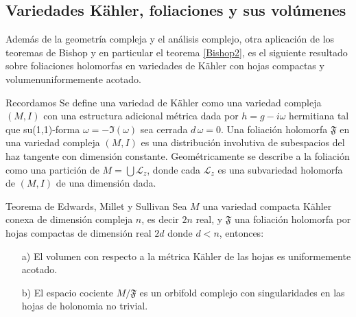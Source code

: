 \documentclass[letterpaper]{beamer}
\begin{document}
\subsection{Variedades K\"ahler, foliaciones y sus vol\'umenes}
\begin{frame} Adem\'as de la geometr\'ia compleja y el an\'alisis complejo, otra aplicaci\'on de los teoremas de Bishop y en particular el teorema
\ref{Bishop2}, es el siguiente resultado sobre foliaciones holomorfas en variedades de K\"ahler con hojas compactas y volumenuniformemente acotado.
\begin{block}{Recordamos}
  Se define una variedad de K\"ahler como una variedad compleja $(M,I)$ con una estructura adicional m\'etrica dada por $h=g-i\omega$ hermitiana tal
  que su(1,1)-forma $\omega=-\Im (\omega)$ sea cerrada $d\,\omega=0$.
  Una foliaci\'on holomorfa $\mathfrak{F}$ en una variedad compleja $(M,I)$ es una distribuci\'on involutiva de subespacios del haz tangente con
  dimensi\'on constante. Geom\'etricamente se describe a la foliaci\'on como una partici\'on de $M=\bigcup\mathcal{L}_z$, donde cada $\mathcal{L}_z$ es una
  subvariedad holomorfa de $(M,I)$ de una dimensi\'on dada.
    \end{block}
\end{frame}

\begin{frame}
\begin{block}{Teorema de Edwards, Millet y Sullivan}\label{EMS}
        Sea $M$ una variedad compacta K\"ahler conexa de dimensi\'on compleja $n$, es decir $2n$ real, y $\mathfrak{F}$ una foliaci\'on holomorfa por hojas
        compactas de dimensi\'on real $2d$ donde $d<n$, entonces:
        \begin{enumerate}
                \item[a)] El volumen con respecto a la m\'etrica K\"ahler de las hojas es uniformemente acotado.
                \item[b)] El espacio cociente $M/\mathfrak{F}$ es un orbifold complejo con singularidades en las hojas de holonomia no trivial.
        \end{enumerate}
      \end{block}
\end{frame}
\end{document}
